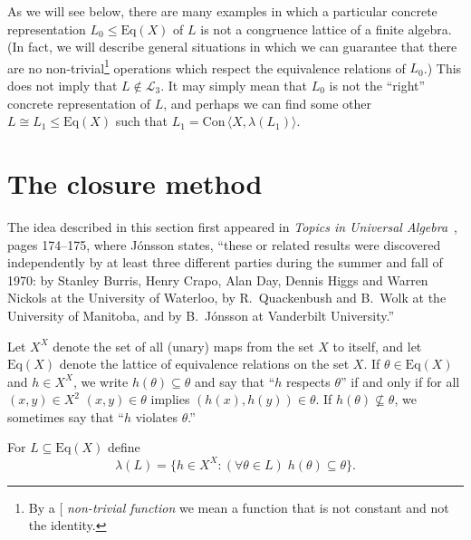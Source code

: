 \documentclass[cm,dissertation]{uhthesis}
\theoremstyle{plain}
\theoremstyle{definition}
\theoremstyle{remark}
\numberwithin{theorem}{section}
\numberwithin{claim}{chapter}
\numberwithin{equation}{section}
\numberwithin{conjecture}{chapter}
\newcommand{\<}{\ensuremath{\langle}}
\renewcommand{\>}{\ensuremath{\rangle}}
\renewcommand{\leq}{\ensuremath{\leqslant}}
\newcommand{\Eq}{\ensuremath{\mathrm{Eq}}}
\newcommand{\Con}{\ensuremath{\mathrm{Con\,}}}
\newcommand{\0}{\ensuremath{\mathbf{0}}}
\newcommand{\1}{\ensuremath{\mathbf{1}}}
\newcommand{\2}{\ensuremath{\mathbf{2}}}
\newcommand{\3}{\ensuremath{\mathbf{3}}}
\newcommand{\4}{\ensuremath{\mathbf{4}}}
\newcommand{\5}{\ensuremath{\mathbf{5}}}
\newcommand{\sL}{\ensuremath{\mathscr{L}}}
\newcommand{\indexit}[1]{\index{#1|textit}}
\def\defn#1{\gdef\defnstring{#1}%
  \xdef\dodefnii{{\noexpand\em
       \defnstring}\noexpand\indexit{\defnstring}\noexpand\makeatother}%
  \futurelet\nextthing\dodefn}
\def\dodefn{%
  \ifx\nextthing[\let\next=\dodefni
    \else\let\next=\dodefnii\fi
  \makeatletter
  \next}
\def\dodefni[#1]{%
  {\em\defnstring}%
  \indexit{#1}%
  \makeatother}
\begin{document}
As we will see below, there are many examples in which a particular concrete
representation $L_0\leq \Eq(X)$ of $L$ is not a congruence lattice of a
finite algebra.  (In fact, we will describe general situations in which we can
guarantee that there are no non-trivial\footnote{By a 
\defn{non-trivial function} we mean a function that is
  not constant and not the identity.} operations which respect the equivalence
relations of $L_0$.)  This does not imply that $L \notin \sL_3$.  It may
simply mean that $L_0$ is not the ``right'' concrete representation of $L$, and
perhaps we can find some other $L \cong L_1\leq \Eq(X)$ such that $L_1 = \Con
\<X, \lambda(L_1)\>$.

\section{The closure method}
\label{sec:closure-method}
The idea described in this section
first appeared in \emph{Topics in Universal Algebra}~\cite{Jonsson:1972}, pages
174--175, where J\'onsson states, ``these or related results were discovered
independently by at least three different parties during the summer and fall of
1970: by Stanley Burris, Henry Crapo, Alan Day, Dennis Higgs and Warren Nickols
at the University of Waterloo, by R.~Quackenbush and B.~Wolk at the University
of Manitoba, and by B.~J\'{o}nsson at Vanderbilt University.''

Let $X^X$ denote the set of all (unary) maps from the set $X$ to itself, and let 
$\Eq(X)$ denote the lattice of equivalence relations on the set $X$.  If $\theta
\in \Eq(X)$ and $h\in X^X$, we write $h(\theta) \subseteq \theta$ and say
that ``$h$ respects $\theta$'' if and only if for all $(x,y)\in X^2$ $(x,y)\in
\theta$ implies 
$(h(x),h(y)) \in \theta$.  If $h(\theta) \nsubseteq \theta$, we sometimes say
that ``$h$ violates $\theta$.''

For $L\subseteq \Eq(X)$ define
      \[
      \lambda(L) = \{h\in X^X: (\forall \theta \in L) \; h(\theta) \subseteq \theta \}.
      \]
\end{document}
